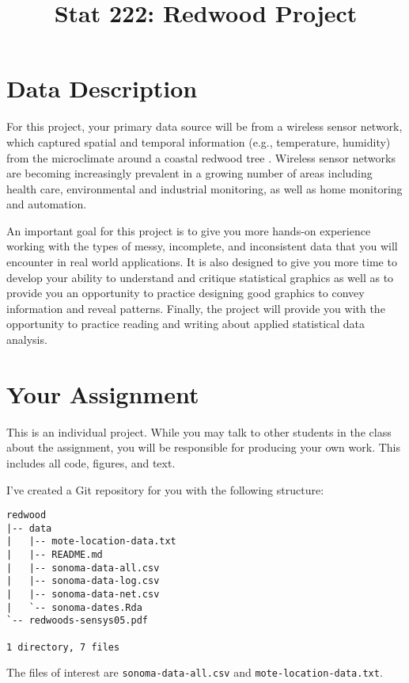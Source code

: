 \documentclass[11pt, oneside]{article}   	%
\title{Stat 222: Redwood Project}
\date{}							%
\begin{document}
\maketitle

\section{Data Description}

For this project, your primary data source will be from a wireless sensor
network, which captured spatial and temporal information (e.g., temperature,
humidity) from the microclimate around a coastal redwood tree
\cite{tolle2005macroscope}.  Wireless sensor networks are becoming increasingly
prevalent in a growing number of areas including health care, environmental and
industrial monitoring, as well as home monitoring and automation.

An important goal for this project is to give you more hands-on experience
working with the types of messy, incomplete, and inconsistent data that you
will encounter in real world applications.  It is also designed to give you
more time to develop your ability to understand and critique statistical
graphics as well as to provide you an opportunity to practice designing good
graphics to convey information and reveal patterns.  Finally, the project will
provide you with the opportunity to practice reading and writing about applied
statistical data analysis.


\section{Your Assignment}

This is an individual project.  While you may talk to other students in the
class about the assignment, you will be responsible for producing your own
work.  This includes all code, figures, and text.

I've created a Git repository for you with the following structure:

\begin{verbatim}
redwood
|-- data
|   |-- mote-location-data.txt
|   |-- README.md
|   |-- sonoma-data-all.csv
|   |-- sonoma-data-log.csv
|   |-- sonoma-data-net.csv
|   `-- sonoma-dates.Rda
`-- redwoods-sensys05.pdf

1 directory, 7 files
\end{verbatim}

The files of
interest are \texttt{sonoma-data-all.csv} and \texttt{mote-location-data.txt}.
\end{document}
